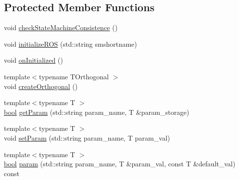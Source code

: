 \subsection*{Protected Member Functions}
\begin{DoxyCompactItemize}
\item 
void \hyperlink{classsmacc_1_1ISmaccStateMachine_af34fa8346ae3f52882704422d59b9055}{check\+State\+Machine\+Consistence} ()
\item 
void \hyperlink{classsmacc_1_1ISmaccStateMachine_a1136dd5d81e846ac86de48bc71912cbf}{initialize\+R\+OS} (std\+::string smshortname)
\item 
void \hyperlink{classsmacc_1_1ISmaccStateMachine_a95e7f71d0d88fffd0afebb1f9ccdade5}{on\+Initialized} ()
\item 
{\footnotesize template$<$typename T\+Orthogonal $>$ }\\void \hyperlink{classsmacc_1_1ISmaccStateMachine_a9155cf3d1877255d70b0bd71648734a3}{create\+Orthogonal} ()
\item 
{\footnotesize template$<$typename T $>$ }\\\hyperlink{classbool}{bool} \hyperlink{classsmacc_1_1ISmaccStateMachine_ac9fda4abe36f62db5ae231289afa4665}{get\+Param} (std\+::string param\+\_\+name, T \&param\+\_\+storage)
\item 
{\footnotesize template$<$typename T $>$ }\\void \hyperlink{classsmacc_1_1ISmaccStateMachine_afc730437f45fa107292c078dfab2aa37}{set\+Param} (std\+::string param\+\_\+name, T param\+\_\+val)
\item 
{\footnotesize template$<$typename T $>$ }\\\hyperlink{classbool}{bool} \hyperlink{classsmacc_1_1ISmaccStateMachine_a2900ef881968af90562abfc9103570f3}{param} (std\+::string param\+\_\+name, T \&param\+\_\+val, const T \&default\+\_\+val) const
\end{DoxyCompactItemize}

